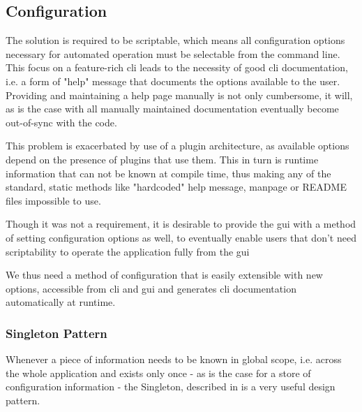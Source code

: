 
\subsection{Configuration}
The solution is required to be scriptable, which means all configuration options necessary for automated operation must be selectable from the command line.
This focus on a feature-rich \gls{cli} leads to the necessity of good \gls{cli} documentation, i.e. a form of "help" message that documents the options available to the user.
Providing and maintaining a help page manually is not only cumbersome, it will, as is the case with all manually maintained documentation eventually become out-of-sync with the code.

This problem is exacerbated by use of a plugin architecture, as available options depend on the presence of plugins that use them. This in turn is runtime information that can not be known at compile time, thus making any of the standard, static methods like "hardcoded" help message, manpage or README files impossible to use.

Though it was not a requirement, it is desirable to provide the \gls{gui} with a method of setting configuration options as well, to eventually enable users that don't need scriptability to operate the application fully from the \gls{gui}

We thus need a method of configuration that is easily extensible with new options, accessible from \gls{cli} and \gls{gui} and generates \gls{cli} documentation automatically at runtime.

\subsubsection{Singleton Pattern}
\label{sec:ston}
Whenever a piece of information needs to be known in global scope, i.e. across the whole application and exists only once - as is the case for a store of configuration information - the Singleton, described in \citet{Gamma1994} is a very useful design pattern. 


